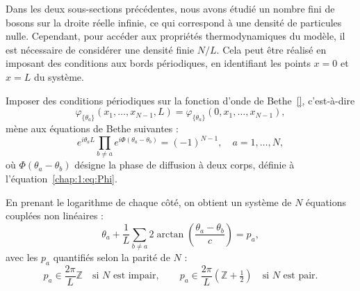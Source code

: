 Dans les deux sous-sections précédentes, nous avons étudié un nombre fini de bosons sur la droite réelle infinie, ce qui correspond à une densité de particules nulle. Cependant, pour accéder aux propriétés thermodynamiques du modèle, il est nécessaire de considérer une densité finie $N/L$. Cela peut être réalisé en imposant des conditions aux bords périodiques, en identifiant les points $x = 0$ et $x = L$ du système.

Imposer des conditions périodiques sur la fonction d’onde de Bethe~\eqref{}, c’est-à-dire
\[
\varphi_{\{\theta_a\}}(x_1, \dots, x_{N-1}, L) = \varphi_{\{\theta_a\}}(0, x_1, \dots, x_{N-1}),
\]
mène aux équations de Bethe suivantes :
\begin{equation}
e^{i \theta_a L} \prod_{b \ne a} e^{i \Phi(\theta_a - \theta_b)} = (-1)^{N-1}, \quad a = 1, \dots, N,
\label{eq:bethe_exp}
\end{equation}
où $\Phi(\theta_a - \theta_b)$ désigne la phase de diffusion à deux corps, définie à l'équation~\eqref{chap:1:eq:Phi}.

En prenant le logarithme de chaque côté, on obtient un système de $N$ équations couplées non linéaires :
\begin{equation}
\theta_a + \frac{1}{L} \sum_{b \ne a} 2 \arctan\left( \frac{\theta_a - \theta_b}{c} \right) = p_a,
\label{eq:bethe_log}
\end{equation}
avec les $p_a$ quantifiés selon la parité de $N$ :
\[
p_a \in \frac{2\pi}{L} \mathbb{Z} \quad \text{si $N$ est impair}, \qquad
p_a \in \frac{2\pi}{L} \left( \mathbb{Z} + \tfrac{1}{2} \right) \quad \text{si $N$ est pair}.
\]